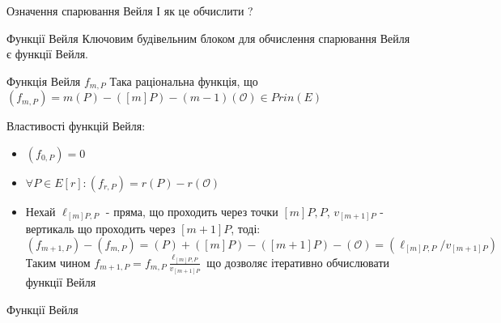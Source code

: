 \documentclass[9pt]{beamer}
\begin{document}
\begin{darkframes}
\begin{frame}{Означення спарювання Вейля}
І як це обчислити ?
    
\end{frame}

\begin{frame}{Функції Вейля}
Ключовим будівельним блоком для обчислення спарювання Вейля є функції Вейля.
\begin{block}{Функція Вейля $f_{m,P}$}
    Така раціональна функція, що $(f_{m,P}) = m(P)-([m]P)-(m-1)(\mathcal{O}) \in Prin(E)$
\end{block}
  Властивості функцій Вейля:
  \begin{itemize}
      \item $(f_{0,P}) = 0$
      \item $\forall P \in E[r]: (f_{r, P}) = r(P)-r(\mathcal{O})$
      \item Нехай $\ell_{[m]P,P}$ - пряма, що проходить через точки $[m]P, P$, $v_{[m+1]P}$ - вертикаль що проходить через $[m+1]P$, тоді: $$(f_{m+1,P})-(f_{m,P}) = (P) + ([m]P)-([m+ 1]P)-(\mathcal{O}) = (\ell_{[m]P,P} / v_{[m+1]P})$$
      Таким чином $f_{m+1,P} = f_{m,P} \frac{\ell_{[m]P,P}}{v_{[m+1]P}}$ що дозволяє ітеративно обчислювати функції Вейля
  \end{itemize}

\end{frame}
\begin{frame}{Функції Вейля}
  \begin{center}
\end{center}
\end{frame}
\end{darkframes}
\end{document}
